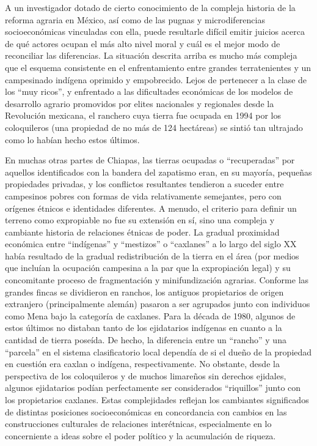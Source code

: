 \documentclass[
  spanish,
  11pt,
  a4paper,
]{scrbook}
\begin{document}
A un investigador dotado de cierto conocimiento de la compleja historia
de la reforma agraria en México, así como de las pugnas y
microdiferencias socioeconómicas vinculadas con ella, puede resultarle
difícil emitir juicios acerca de qué actores ocupan el más alto nivel
moral y cuál es el mejor modo de reconciliar las diferencias. La
situación descrita arriba es mucho más compleja que el esquema
consistente en el enfrentamiento entre grandes terratenientes y un
campesinado indígena oprimido y empobrecido. Lejos de pertenecer a la
clase de los ``muy ricos'', y enfrentado a las dificultades económicas
de los modelos de desarrollo agrario promovidos por elites nacionales y
regionales desde la Revolución mexicana, el ranchero cuya tierra fue
ocupada en 1994 por los coloquileros (una propiedad de no más de 124
hectáreas) se sintió tan ultrajado como lo habían hecho estos últimos.

En muchas otras partes de Chiapas, las tierras ocupadas o
``recuperadas'' por aquellos identificados con la bandera del zapatismo
eran, en su mayoría, pequeñas propiedades privadas, y los conflictos
resultantes tendieron a suceder entre campesinos pobres con formas de
vida relativamente semejantes, pero con orígenes étnicos e identidades
diferentes. A menudo, el criterio para definir un terreno como
expropiable no fue su extensión en sí, sino una compleja y cambiante
historia de relaciones étnicas de poder. La gradual proximidad económica
entre ``indígenas'' y ``mestizos'' o ``caxlanes'' a lo largo del siglo
XX había resultado de la gradual redistribución de la tierra en el área
(por medios que incluían la ocupación campesina a la par que la
expropiación legal) y su concomitante proceso de fragmentación y
minifundización agrarias. Conforme las grandes fincas se dividieron en
ranchos, los antiguos propietarios de origen extranjero (principalmente
alemán) pasaron a ser agrupados junto con individuos como Mena bajo la
categoría de caxlanes. Para la década de 1980, algunos de estos últimos
no distaban tanto de los ejidatarios indígenas en cuanto a la cantidad
de tierra poseída. De hecho, la diferencia entre un ``rancho'' y una
``parcela'' en el sistema clasificatorio local dependía de si el dueño
de la propiedad en cuestión era caxlan o indígena, respectivamente. No
obstante, desde la perspectiva de los coloquileros y de muchos limareños
sin derechos ejidales, algunos ejidatarios podían perfectamente ser
considerados ``riquillos'' junto con los propietarios caxlanes. Estas
complejidades reflejan los cambiantes significados de distintas
posiciones socioeconómicas en concordancia con cambios en las
construcciones culturales de relaciones interétnicas, especialmente en
lo concerniente a ideas sobre el poder político y la acumulación de
riqueza.
\end{document}
